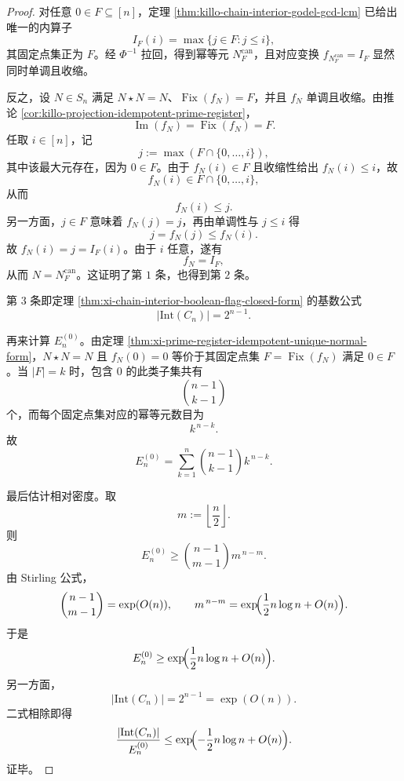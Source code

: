 \begin{proof}
对任意 \(0\in F\subseteq[n]\)，定理 \ref{thm:killo-chain-interior-godel-gcd-lcm} 已给出唯一的内算子
\[
I_F(i)=\max\{j\in F:j\le i\},
\]
其固定点集正为 \(F\)。经 \(\Phi^{-1}\) 拉回，得到幂等元 \(N_F^{\mathrm{can}}\)，且对应变换 \(f_{N_F^{\mathrm{can}}}=I_F\) 显然同时单调且收缩。

反之，设 \(N\in S_n\) 满足 \(N\star N=N\)、\(\operatorname{Fix}(f_N)=F\)，并且 \(f_N\) 单调且收缩。由推论 \ref{cor:killo-projection-idempotent-prime-register}，
\[
\operatorname{Im}(f_N)=\operatorname{Fix}(f_N)=F.
\]
任取 \(i\in[n]\)，记
\[
j:=\max(F\cap\{0,\dots,i\}),
\]
其中该最大元存在，因为 \(0\in F\)。由于 \(f_N(i)\in F\) 且收缩性给出 \(f_N(i)\le i\)，故
\[
f_N(i)\in F\cap\{0,\dots,i\},
\]
从而
\[
f_N(i)\le j.
\]
另一方面，\(j\in F\) 意味着 \(f_N(j)=j\)，再由单调性与 \(j\le i\) 得
\[
j=f_N(j)\le f_N(i).
\]
故 \(f_N(i)=j=I_F(i)\)。由于 \(i\) 任意，遂有
\[
f_N=I_F,
\]
从而 \(N=N_F^{\mathrm{can}}\)。这证明了第 \(1\) 条，也得到第 \(2\) 条。

第 \(3\) 条即定理 \ref{thm:xi-chain-interior-boolean-flag-closed-form} 的基数公式
\[
|\mathrm{Int}(C_n)|=2^{n-1}.
\]

再来计算 \(E_n^{(0)}\)。由定理 \ref{thm:xi-prime-register-idempotent-unique-normal-form}，\(N\star N=N\) 且 \(f_N(0)=0\) 等价于其固定点集 \(F=\operatorname{Fix}(f_N)\) 满足 \(0\in F\)。当 \(|F|=k\) 时，包含 \(0\) 的此类子集共有
\[
\binom{n-1}{k-1}
\]
个，而每个固定点集对应的幂等元数目为
\[
k^{\,n-k}.
\]
故
\[
E_n^{(0)}=\sum_{k=1}^{n}\binom{n-1}{k-1}k^{\,n-k}.
\]

最后估计相对密度。取
\[
m:=\left\lfloor \frac n2\right\rfloor.
\]
则
\[
E_n^{(0)}
\ge
\binom{n-1}{m-1}m^{\,n-m}.
\]
由 Stirling 公式，
\[
\binom{n-1}{m-1}=\exp(O(n)),
\qquad
m^{\,n-m}
=
\exp\!\Bigl(\frac12 n\log n+O(n)\Bigr).
\]
于是
\[
E_n^{(0)}
\ge
\exp\!\Bigl(\frac12 n\log n+O(n)\Bigr).
\]
另一方面，
\[
|\mathrm{Int}(C_n)|=2^{n-1}=\exp(O(n)).
\]
二式相除即得
\[
\frac{|\mathrm{Int}(C_n)|}{E_n^{(0)}}
\le
\exp\!\Bigl(-\frac12 n\log n+O(n)\Bigr).
\]
证毕。
\end{proof}
